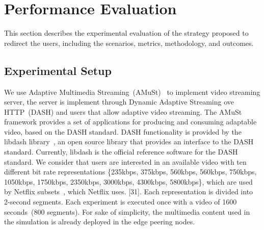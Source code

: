\section{Performance Evaluation}
\label{sec:results}

This section describes the experimental evaluation of the strategy proposed to redirect the users, including the scenarios, metrics, methodology, and outcomes.
 
%

\subsection{Experimental Setup}


We use Adaptive Multimedia Streaming~(AMuSt)~\cite{kreuzberger2016amust} to implement video streaming server, the server is implement through Dynamic Adaptive Streaming ove HTTP~(DASH) and users that allow adaptive video streaming. The AMuSt framework provides a set of applications for producing and consuming adaptable video, based on the DASH standard. DASH functionality is provided by the libdash library~\cite{mueller2013ICMEW}, an open source library that provides an interface to the DASH standard. Currently, libdash is the official reference software for the DASH standard. We consider that users are interested in an available video with ten different bit rate representations \{235kbps, 375kbps, 560kbps, 560kbps, 750kbps, 1050kbps, 1750kbps, 2350kbps, 3000kbps, 4300kbps, 5800kbps\}, which are used by Netflix subsets~\cite{netflix:representation}, which Netflix uses. [31]. Each representation is divided into 2-second segments. Each experiment is executed once with a video of 1600 seconds~(800 segments). 
For sake of simplicity, the multimedia content used in the simulation is already deployed in the edge peering nodes. 

